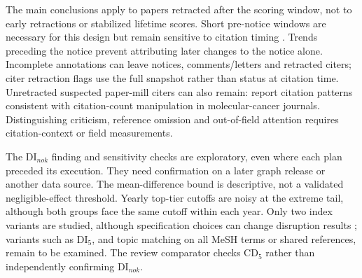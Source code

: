 The main conclusions apply to papers retracted after the scoring window, not to early retractions or stabilized
lifetime scores. Short pre-notice windows are necessary for this design but remain sensitive to citation timing
\citep{bornmann2019window,lin2026displacement}. Trends preceding the notice prevent attributing later changes
to the notice alone. Incomplete annotations can leave notices, comments/letters and retracted citers;
citer retraction flags use the full snapshot rather than status at citation time.
Unretracted suspected paper-mill citers can also remain: \citet{scancar2026distortion} report citation patterns
consistent with citation-count manipulation in molecular-cancer journals. Distinguishing criticism, reference
omission and out-of-field attention requires citation-context or field measurements.

The DI$_{nok}$ finding and sensitivity checks are exploratory, even where each plan preceded its execution.
They need confirmation on a later graph release or another data source. The mean-difference bound is descriptive,
not a validated negligible-effect threshold. Yearly top-tier cutoffs are noisy at the extreme tail, although
both groups face the same cutoff within each year. Only two index variants are studied, although specification
choices can change disruption results \citep{leibel2024specification}; variants such as DI$_5$, and topic matching
on all MeSH terms or shared references, remain to be examined. The review comparator checks CD$_5$ rather than
independently confirming DI$_{nok}$.
